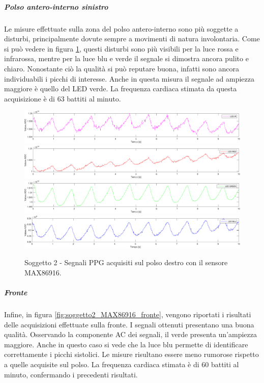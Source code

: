 \subparagraph{Polso antero-interno sinistro}

Le misure effettuate sulla zona del polso antero-interno sono più soggette a disturbi, principalmente dovute sempre a movimenti di natura involontaria. Come si può vedere in figura \ref{fig:soggetto2_MAX86916_polso}, questi disturbi sono più visibili per la luce rossa e infrarossa, mentre per la luce blu e verde il segnale si dimostra ancora pulito e chiaro. Nonostante ciò la qualità si può reputare buona, infatti sono ancora individuabili i picchi di interesse. Anche in questa misura il segnale ad ampiezza maggiore è quello del LED verde. La frequenza cardiaca stimata da questa acquisizione è di 63 battiti al minuto.
\begin{figure}[h]
	\centering
	\includegraphics[width=1\linewidth]{ImageFiles/Misure Preliminari/Soggetto 2/max86916/polso_inferiore_ired}
	\includegraphics[width=1\linewidth]{ImageFiles/Misure Preliminari/Soggetto 2/max86916/polso_inferiore_red}
	\includegraphics[width=1\linewidth]{ImageFiles/Misure Preliminari/Soggetto 2/max86916/polso_inferiore_green}
	\includegraphics[width=1\linewidth]{ImageFiles/Misure Preliminari/Soggetto 2/max86916/polso_inferiore_blu}
	\caption{Soggetto 2 - Segnali PPG acquisiti sul polso destro con il sensore MAX86916.}
	\label{fig:soggetto2_MAX86916_polso}
\end{figure}

\clearpage

\subparagraph{Fronte}
Infine, in figura \ref{fig:soggetto2_MAX86916_fronte}, vengono riportati i risultati delle acquisizioni effettuate sulla fronte. I segnali ottenuti presentano una buona qualità. Osservando la componente AC dei segnali, il verde presenta un'ampiezza maggiore. Anche in questo caso si vede che la luce blu permette di identificare correttamente i picchi sistolici. Le misure risultano essere meno rumorose rispetto a quelle acquisite sul polso. La frequenza cardiaca stimata è di 60 battiti al minuto, confermando i precedenti risultati.

